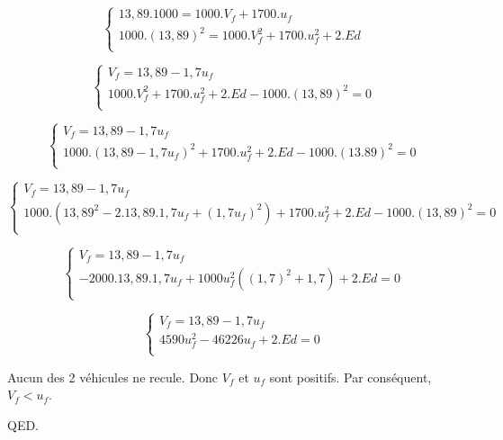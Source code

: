 \documentclass[]{book}
\theoremstyle{definition}
\begin{document}
$$
\left\{ 
\begin{array}{l}
 13,89.1000 = 1000.V_f + 1700.u_f \\
 1000.(13,89)^2  = 1000.V_f^2 + 1700.u_f^2 + 2.Ed\\
\end{array}
\right. 
$$

$$
\left\{ 
\begin{array}{l}
 V_f = 13,89 - 1,7u_f  \\
 1000.V_f^2 + 1700.u_f^2 + 2.Ed - 1000.(13,89)^2 = 0\\
\end{array}
\right. 
$$
 
$$
\left\{ 
\begin{array}{l}
 V_f = 13,89 - 1,7u_f  \\
 1000.(13,89 - 1,7u_f)^2 + 1700.u_f^2 + 2.Ed - 1000.(13.89)^2 = 0\\
\end{array}
\right. 
$$

$$
\left\{ 
\begin{array}{l}
 V_f = 13,89 - 1,7u_f  \\
 1000.(13,89^2 - 2.13,89.1,7u_f + (1,7u_f)^2) + 1700.u_f^2 + 2.Ed - 1000.(13,89)^2 = 0\\
\end{array}
\right. 
$$

$$
\left\{ 
\begin{array}{l}
 V_f = 13,89 - 1,7u_f  \\
 - 2000.13,89.1,7u_f + 1000u_f^2((1,7)^2 + 1,7) + 2.Ed  = 0\\
\end{array}
\right. 
$$

$$
\left\{ 
\begin{array}{l}
 V_f = 13,89 - 1,7u_f  \\
 4590u_f^2 - 46226u_f + 2.Ed  = 0\\
\end{array}
\right. 
$$

Aucun des 2 v\'ehicules ne recule. Donc $V_f$ et $u_f$ sont positifs. Par cons\'equent, $V_f < u_f$.


QED.
\end{document}
